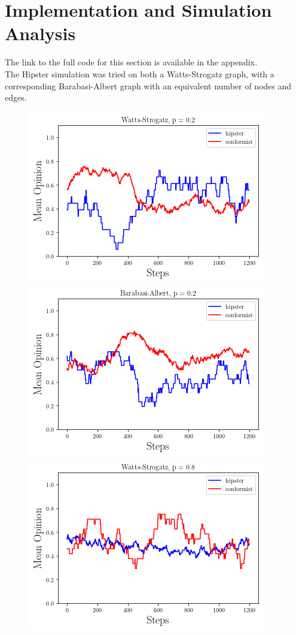 \documentclass{article}
\begin{document}
\section*{Implementation and Simulation Analysis}
The link to the full code for this section is available in the appendix. \\

The Hipster simulation was tried on both a Watts-Strogatz graph, with a corresponding Barabasi-Albert graph with an equivalent number of nodes and edges. 
\newpage

\begin{figure}[h!]
\centering
\includegraphics[scale = 0.6]{ws1.png}
\includegraphics[scale = 0.6]{ba1.png}
\includegraphics[scale = 0.6]{ws4.png}

\end{figure}
\end{document}
